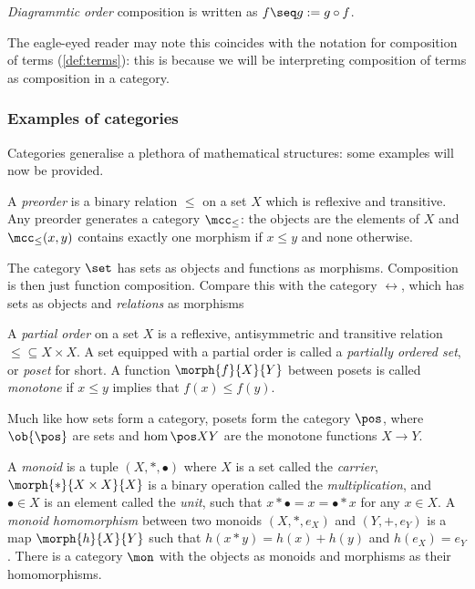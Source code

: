 \begin{notation}
    \emph{Diagrammtic order} composition is written as
    \(f \seq g := g \circ f\).
\end{notation}

The eagle-eyed reader may note this coincides with the notation for composition
of terms (\cref{def:terms}): this is because we will be interpreting composition
of terms as composition in a category.

\subsubsection{Examples of categories}

Categories generalise a plethora of mathematical structures: some examples will
now be provided.

\begin{example}[Preorder]
    A \emph{preorder} is a binary relation \(\leq\) on a set \(X\) which is
    reflexive and transitive.
    Any preorder generates a category \(\mcc_\leq\): the objects are the
    elements of \(X\) and \(\mcc_\leq(x, y)\) contains exactly one morphism if
    \(x \leq y\) and none otherwise.
\end{example}

\begin{example}[Sets]
    The category \(\set\) has sets as objects and functions as morphisms.
    Composition is then just function composition.
    Compare this with the category \(\rel\), which has sets as objects and
    \emph{relations} as morphisms
\end{example}

\begin{example}[Posets]
    A \emph{partial order} on a set \(X\) is a reflexive, antisymmetric and
    transitive relation \(\leq \subseteq X \times X\).
    A set equipped with a partial order is called a
    \emph{partially ordered set}, or \emph{poset} for short.
    A function \(\morph{f}{X}{Y}\) between posets is called \emph{monotone} if
    \(x \leq y\) implies that \(f(x) \leq f(y)\).

    Much like how sets form a category, posets form the category \(\pos\), where
    \(\ob{\pos}\) are sets and \(\hom{\pos}{X}{Y}\) are the monotone functions
    \(X \to Y\).
\end{example}

\begin{example}[Monoids]
    A \emph{monoid} is a tuple \((X, *, \bullet)\) where \(X\) is a set called
    the \emph{carrier}, \(\morph{*}{X \times X}{X}\) is a binary operation
    called the \emph{multiplication}, and \(\bullet \in X\) is an element called
    the \emph{unit}, such that \(x * \bullet = x = \bullet * x\) for any
    \(x \in X\).
    A \emph{monoid homomorphism} between two monoids \((X, *, e_X)\) and
    \((Y, +, e_Y)\) is a map \(\morph{h}{X}{Y}\) such that
    \(h(x * y) = h(x) + h(y)\) and \(h(e_X) = e_Y\).
    There is a category \(\mon\) with the objects as monoids and morphisms as
    their homomorphisms.
\end{example}

